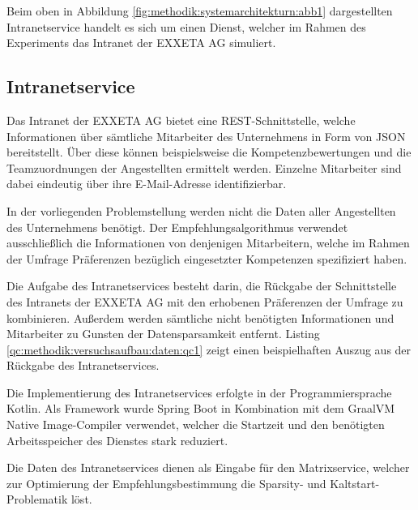 Beim oben in Abbildung \ref{fig:methodik:systemarchitekturn:abb1} dargestellten Intranetservice handelt es sich um einen Dienst, welcher im Rahmen des Experiments das Intranet der EXXETA AG simuliert.

\subsection{Intranetservice}
\label{ch:methodik:versuchsaufbau:systemarchitektur:intranetservice}
Das Intranet der EXXETA AG bietet eine REST-Schnittstelle, welche Informationen über sämtliche Mitarbeiter des Unternehmens in Form von JSON bereitstellt. Über diese können beispielsweise die Kompetenzbewertungen und die Teamzuordnungen der Angestellten ermittelt werden. Einzelne Mitarbeiter sind dabei eindeutig über ihre E-Mail-Adresse identifizierbar.

In der vorliegenden Problemstellung werden nicht die Daten aller Angestellten des Unternehmens benötigt. Der Empfehlungsalgorithmus verwendet ausschließlich die Informationen von denjenigen Mitarbeitern, welche im Rahmen der Umfrage Präferenzen bezüglich eingesetzter Kompetenzen spezifiziert haben.

Die Aufgabe des Intranetservices besteht darin, die Rückgabe der Schnittstelle des Intranets der EXXETA AG mit den erhobenen Präferenzen der Umfrage zu kombinieren. Außerdem werden sämtliche nicht benötigten Informationen und Mitarbeiter zu Gunsten der Datensparsamkeit entfernt. Listing \ref{qc:methodik:versuchsaufbau:daten:qc1} zeigt einen beispielhaften Auszug aus der Rückgabe des Intranetservices.



Die Implementierung des Intranetservices erfolgte in der Programmiersprache Kotlin. Als Framework wurde Spring Boot in Kombination mit dem GraalVM Native Image-Compiler verwendet, welcher die Startzeit und den benötigten Arbeitsspeicher des Dienstes stark reduziert.

Die Daten des Intranetservices dienen als Eingabe für den Matrixservice, welcher zur Optimierung der Empfehlungsbestimmung die Sparsity- und Kaltstart-Problematik löst.

